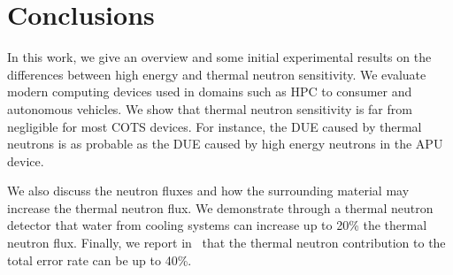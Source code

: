 \section{Conclusions}
\label{sec_conclusion}

In this work, we give an overview and some initial experimental results on the differences between high energy and thermal neutron sensitivity. We evaluate modern computing devices used in domains such as HPC to consumer and autonomous vehicles. We show that thermal neutron sensitivity is far from negligible for most COTS devices. For instance, the DUE caused by thermal neutrons is as probable as the DUE caused by high energy neutrons
in the APU device.

We also discuss the neutron fluxes and how the surrounding material may increase the thermal neutron flux. We demonstrate through a thermal neutron detector that water from cooling systems can increase up to 20\% the thermal neutron flux. Finally, we report in~\cite{jsc2020} that the thermal neutron contribution to the total error rate can be up to 40\%.

%
